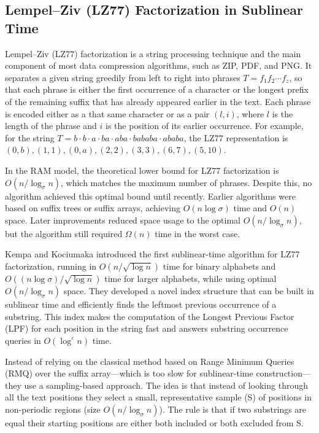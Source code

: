 \subsection{Lempel–Ziv (LZ77) Factorization in Sublinear Time}
Lempel–Ziv (LZ77) factorization is a string processing technique and the main component of most data compression algorithms, such as ZIP, PDF, and PNG. It separates a given string greedily from left to right into phrases \break \( T = f_1 f_2 \cdots f_z \), so that each phrase is either the first occurrence of a character or the longest prefix of the remaining suffix that has already appeared earlier in the text. Each phrase is encoded either as a that same character or as a pair \((l, i)\), where \(l\) is the length of the phrase and \(i\) is the position of its earlier occurrence. For example, for the string \( T = b \cdot b \cdot a \cdot ba \cdot aba \cdot bababa \cdot ababa \), the LZ77 representation is \((0, b), (1,1), (0, a), (2,2), (3,3), (6, 7), (5, 10)\).

In the RAM model, the theoretical lower bound for LZ77 factorization is \( O(n / \log_{\sigma} n) \), which matches the maximum number of phrases. Despite this, no algorithm achieved this optimal bound until recently.
Earlier algorithms were based on suffix trees or suffix arrays, achieving \( O(n \log \sigma) \) time and \( O(n) \) space. Later improvements reduced space usage to the optimal \( O(n / \log_{\sigma} n) \), but the algorithm still required \(\Omega (n)\) time in the worst case.

Kempa and Kociumaka introduced the first sublinear-time algorithm for LZ77 factorization, running in \( O(n / \sqrt{\log n}) \) time for binary alphabets and \break \( O((n \log \sigma) / \sqrt{\log n}) \) time for larger alphabets, while using optimal \( O(n / \log_{\sigma} n) \) space. They developed a novel index structure that can be built in sublinear time and efficiently finds the leftmost previous occurrence of a substring. This index makes the computation of the Longest Previous Factor (LPF) for each position in the string fast and answers substring occurrence queries in \( O(\log^{\varepsilon} n) \) time.

Instead of relying on the classical method based on Range Minimum Queries (RMQ) over the suffix array—which is too slow for sublinear-time construction—they use a sampling-based approach. The idea is that instead of looking through all the text positions they select a small, representative sample (S) of positions in non-periodic regions (size \(O(n / \log_{\sigma} n)\)). The rule is that if two substrings are equal their starting positions are either both included or both excluded from S.

